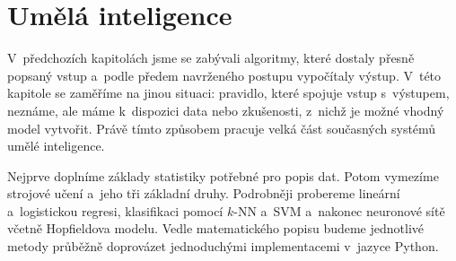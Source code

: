 \chapter{Umělá inteligence}\label{chap:ai}

V~předchozích kapitolách jsme se zabývali algoritmy, které dostaly přesně popsaný vstup a~podle předem navrženého postupu vypočítaly výstup. V~této kapitole se zaměříme na jinou situaci: pravidlo, které spojuje vstup s~výstupem, neznáme, ale máme k~dispozici data nebo zkušenosti, z~nichž je možné vhodný model vytvořit. Právě tímto způsobem pracuje velká část současných systémů umělé inteligence.

Nejprve doplníme základy statistiky potřebné pro popis dat. Potom vymezíme strojové učení a~jeho tři základní druhy. Podrobněji probereme lineární a~logistickou regresi, klasifikaci pomocí \(k\)-NN a~SVM a~nakonec neuronové sítě včetně Hopfieldova modelu. Vedle matematického popisu budeme jednotlivé metody průběžně doprovázet jednoduchými implementacemi v~jazyce Python.
























